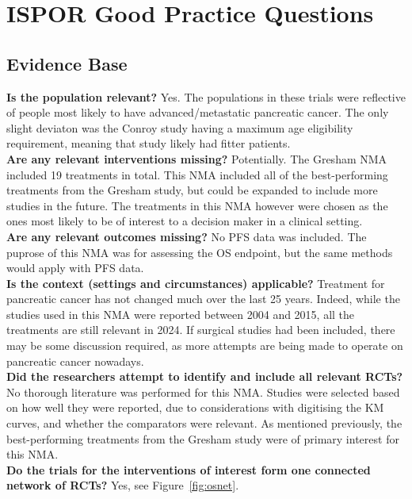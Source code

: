 \chapter{ISPOR Good Practice Questions}\label{isporqs}

\section{Evidence Base}
\textbf{Is the population relevant?} Yes. The populations in these trials were reflective of people most likely to have advanced/metastatic pancreatic cancer. The only slight deviaton was the Conroy study having a maximum age eligibility requirement, meaning that study likely had fitter patients.\\ 

\textbf{Are any relevant interventions missing?} Potentially. The Gresham NMA included 19 treatments in total. This NMA included all of the best-performing treatments from the Gresham study, but could be expanded to include more studies in the future. The treatments in this NMA however were chosen as the ones most likely to be of interest to a decision maker in a clinical setting. \\ 

\textbf{Are any relevant outcomes missing?} No PFS data was included. The puprose of this NMA was for assessing the OS endpoint, but the same methods would apply with PFS data. \\

\textbf{Is the context (settings and circumstances) applicable?} Treatment for pancreatic cancer has not changed much over the last 25 years. Indeed, while the studies used in this NMA were reported between 2004 and 2015, all the treatments are still relevant in 2024. If surgical studies had been included, there may be some discussion required, as more attempts are being made to operate on pancreatic cancer nowadays. \\

\textbf{Did the researchers attempt to identify and include all
relevant RCTs?} No thorough literature was performed for this NMA. Studies were selected based on how well they were reported, due to considerations with digitising the KM curves, and whether the comparators were relevant. As mentioned previously, the best-performing treatments from the Gresham study were of primary interest for this NMA.\\

\textbf{Do the trials for the interventions of interest form one
connected network of RCTs?} Yes, see Figure~\ref{fig:osnet}.\\

